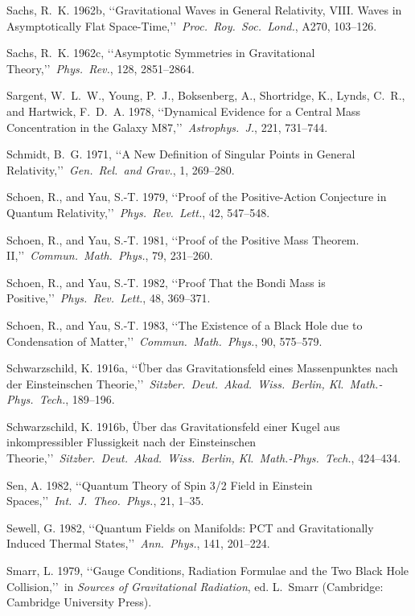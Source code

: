 \item Sachs, R.~K. 1962b, \lq\lq Gravitational Waves in General Relativity, VIII. Waves in Asymptotically Flat Space-Time,\rq\rq\ \emph{Proc.\ Roy.\ Soc.\ Lond.}, A270, 103--126.
\item Sachs, R.~K. 1962c, \lq\lq Asymptotic Symmetries in Gravitational Theory,\rq\rq\ \emph{Phys.\ Rev.}, 128, 2851--2864.
\item Sargent, W.~L.~W., Young, P.~J., Boksenberg, A., Shortridge, K., Lynds, C.~R., and Hartwick, F.~D.~A. 1978, \lq\lq Dynamical Evidence for a Central Mass Concentration in the Galaxy M87,\rq\rq\ \emph{Astrophys.\ J.}, 221, 731--744.
\item Schmidt, B.~G. 1971, \lq\lq A New Definition of Singular Points in General Relativity,\rq\rq\ \emph{Gen.\ Rel.\ and Grav.}, 1, 269--280.
\item Schoen, R., and Yau, S.-T. 1979, \lq\lq Proof of the Positive-Action Conjecture in Quantum Relativity,\rq\rq\ \emph{Phys.\ Rev.\ Lett.}, 42, 547--548.
\item Schoen, R., and Yau, S.-T. 1981, \lq\lq Proof of the Positive Mass Theorem. II,\rq\rq\ \emph{Commun.\ Math.\ Phys.}, 79, 231--260.
\item Schoen, R., and Yau, S.-T. 1982, \lq\lq Proof That the Bondi Mass is Positive,\rq\rq\ \emph{Phys.\ Rev.\ Lett.}, 48, 369--371.
\item Schoen, R., and Yau, S.-T. 1983, \lq\lq The Existence of a Black Hole due to Condensation of Matter,\rq\rq\ \emph{Commun.\ Math.\ Phys.}, 90, 575--579.
\item Schwarzschild, K. 1916a, \lq\lq {\"U}ber das Gravitationsfeld eines Massenpunktes nach der Einsteinschen Theorie,\rq\rq\ \emph{Sitzber.\ Deut.\ Akad.\ Wiss.\ Berlin, Kl.\ Math.-Phys.\ Tech.}, 189--196.
\item Schwarzschild, K. 1916b, {\"U}ber das Gravitationsfeld einer Kugel aus inkompressibler Flussigkeit nach der Einsteinschen Theorie,\rq\rq\ \emph{Sitzber.\ Deut.\ Akad.\ Wiss.\ Berlin, Kl.\ Math.-Phys.\ Tech.}, 424--434.
\item Sen, A. 1982, \lq\lq Quantum Theory of Spin 3/2 Field in Einstein Spaces,\rq\rq\ \emph{Int.\ J.\ Theo.\ Phys.}, 21, 1--35.
\item Sewell, G. 1982, \lq\lq Quantum Fields on Manifolds: PCT and Gravitationally Induced Thermal States,\rq\rq\ \emph{Ann.\ Phys.}, 141, 201--224.
\item Smarr, L. 1979, \lq\lq Gauge Conditions, Radiation Formulae and the Two Black Hole Collision,\rq\rq\ in \emph{Sources of Gravitational Radiation}, ed. L.~Smarr (Cambridge: Cambridge University Press).
